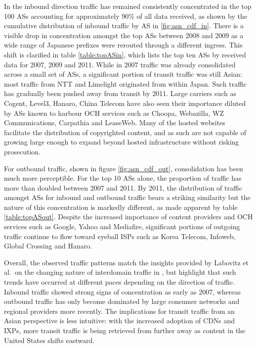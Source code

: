 In the inbound direction traffic has remained consistently concentrated in the top 100 \acp{AS} accounting for approximately 90\% of all data received, as shown by the cumulative distribution of inbound traffic by \acs{AS} in \ref{fig:asn_cdf_in}.
There is a visible drop in concentration amongst the top \acp{AS} between 2008 and 2009 as a wide range of Japanese prefixes were rerouted through a different ingress.
This shift is clarified in table \ref{table:topASin}, which lists the top ten \acp{AS} by received data for 2007, 2009 and 2011.
While in 2007 traffic was already consolidated across a small set of \acp{AS}, a significant portion of transit traffic was still Asian: most traffic from \acs{NTT} and Limelight originated from within Japan. 
Such traffic has gradually been pushed away from transit by 2011.
Large carriers such as Cogent, Level3, Hanaro, China Telecom have also seen their importance diluted by \acp{AS} known to harbour \ac{OCH} services such as Choopa, Webazilla, WZ Communications, Carpathia and LeaseWeb.
Many of the hosted websites facilitate the distribution of copyrighted content, and as such are not capable of growing large enough to expand beyond hosted infrastructure without risking prosecution.

For outbound traffic, shown in figure \ref{fig:asn_cdf_out}, consolidation has been much more perceptible. 
For the top 10 \acp{AS} alone, the proportion of traffic has more than doubled between 2007 and 2011. 
By 2011, the distribution of traffic amongst \acp{AS} for inbound and outbound traffic bears a striking similarity but the nature of this concentration is markedly different, as made apparent by table \ref{table:topASout}.
Despite the increased importance of content providers and \ac{OCH} services such as Google, Yahoo and Mediafire, significant portions of outgoing traffic continue to flow toward eyeball \acp{ISP} such as Korea Telecom, Infoweb, Global Crossing and Hanaro.

Overall, the observed traffic patterns match the insights provided by Labovitz et al.\ on the changing nature of interdomain traffic in \cite{Labovitz:2010p175}, but highlight that such trends have occurred at different paces depending on the direction of traffic. 
Inbound traffic showed strong signs of concentration as early as 2007, whereas outbound traffic has only become dominated by large consumer networks and regional providers more recently.
The implications for transit traffic from an Asian perspective is less intuitive: with the increased adoption of \acp{CDN} and \acp{IXP}, more transit traffic is being retrieved from further away as content in the United States shifts eastward.


